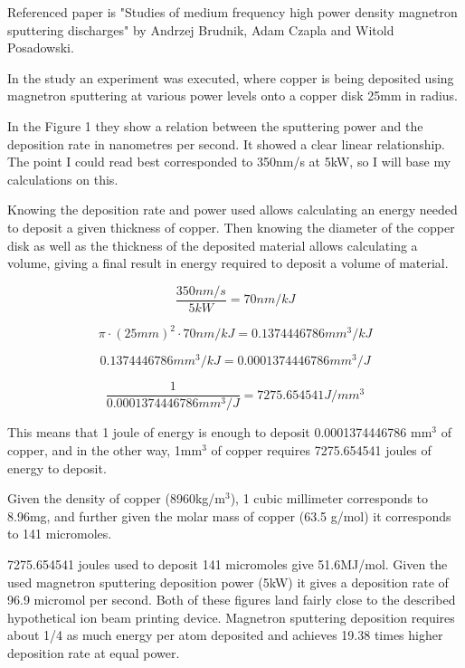 \documentclass[a4paper]{article}
\begin{document}
	Referenced paper is "Studies of medium frequency high power density magnetron sputtering discharges" by Andrzej Brudnik, Adam Czapla and Witold Posadowski.
	
	\bigskip
	
	In the study an experiment was executed, where copper is being deposited using magnetron sputtering at various power levels onto a copper disk 25mm in radius.
	
	\medskip
	
	In the Figure 1 they show a relation between the sputtering power and the deposition rate in nanometres per second.
	It showed a clear linear relationship.
	The point I could read best corresponded to 350nm/s at 5kW, so I will base my calculations on this.
	
	\bigskip
	
	Knowing the deposition rate and power used allows calculating an energy needed to deposit a given thickness of copper.
	Then knowing the diameter of the copper disk as well as the thickness of the deposited material allows calculating a volume, giving a final result in energy required to deposit a volume of material.
	
	$$ \frac{350nm/s}{5kW} = 70nm/kJ $$
	
	$$ \pi \cdot (25mm)^2 \cdot 70nm/kJ = 0.1374446786 mm^3/kJ $$
	
	$$ 0.1374446786 mm^3/kJ = 0.0001374446786 mm^3/J $$
	
	$$ \frac{1}{0.0001374446786 mm^3/J} = 7275.654541 J/mm^3 $$
	
	This means that 1 joule of energy is enough to deposit 0.0001374446786 mm$^3$ of copper, and in the other way, 1mm$^3$ of copper requires 7275.654541 joules of energy to deposit.
	
	\medskip
	
	Given the density of copper (8960kg/m$^3$), 1 cubic millimeter corresponds to 8.96mg, and further given the molar mass of copper (63.5 g/mol) it corresponds to 141 micromoles.
	
	\medskip
	
	7275.654541 joules used to deposit 141 micromoles give 51.6MJ/mol.
	Given the used magnetron sputtering deposition power (5kW) it gives a deposition rate of 96.9 micromol per second.
	Both of these figures land fairly close to the described hypothetical ion beam printing device.
	Magnetron sputtering deposition requires about 1/4 as much energy per atom deposited and achieves 19.38 times higher deposition rate at equal power.
	
\end{document}
